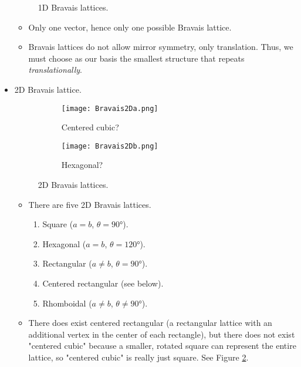 \documentclass[../notes.tex]{subfiles}
\begin{document}
\begin{itemize}
\begin{figure}[h!]
        \caption{1D Bravais lattices.}
        \label{fig:Bravais1D}
    \end{figure}
    \begin{itemize}
        \item Only one vector, hence only one possible Bravais lattice.
        \item Bravais lattices do not allow mirror symmetry, only translation. Thus, we must choose as our basis the smallest structure that repeats \emph{translationally}.
    \end{itemize}
    \item 2D Bravais lattice.
    \begin{figure}[h!]
        \centering
        \begin{subfigure}[b]{0.4\linewidth}
            \centering
            \texttt{[image: Bravais2Da.png]}
            \caption{Centered cubic?}
            \label{fig:Bravais2Da}
        \end{subfigure}
        \begin{subfigure}[b]{0.4\linewidth}
            \centering
            \texttt{[image: Bravais2Db.png]}
            \caption{Hexagonal?}
            \label{fig:Bravais2Db}
        \end{subfigure}
        \caption{2D Bravais lattices.}
        \label{fig:Bravais2D}
    \end{figure}
    \begin{itemize}
        \item There are five 2D Bravais lattices.
        \begin{enumerate}
            \item Square ($a=b$, $\theta=\ang{90}$).
            \item Hexagonal ($a=b$, $\theta=\ang{120}$).
            \item Rectangular ($a\neq b$, $\theta=\ang{90}$).
            \item Centered rectangular (see below).
            \item Rhomboidal ($a\neq b$, $\theta\neq\ang{90}$).
        \end{enumerate}
        \item There does exist centered rectangular (a rectangular lattice with an additional vertex in the center of each rectangle), but there does not exist "centered cubic" because a smaller, rotated square can represent the entire lattice, so "centered cubic" is really just square. See Figure \ref{fig:Bravais2Da}.

\end{itemize}
\end{itemize}
\end{document}
